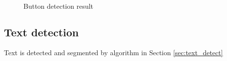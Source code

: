 	\begin{figure}[H]
	    \centering
	    

	    \caption{Button detection result}
		\label{fig:btn_detect}
	\end{figure}

\subsection{Text detection}
Text is detected and segmented by algorithm in Section \ref{sec:text_detect}


